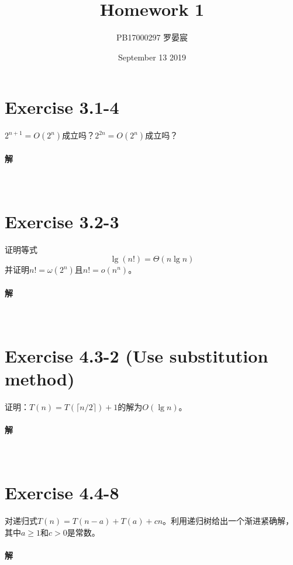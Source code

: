 \documentclass{article}
\title{Homework 1}
\author{PB17000297 罗晏宸}
\date{September 13 2019}
\begin{document}
\maketitle

\section{Exercise 3.1-4}
$2^{n+1}=O(2^n)$成立吗？$2^{2n}=O(2^n)$成立吗？
\\

\paragraph{解} 
\\

\section{Exercise 3.2-3}
证明等式
\begin{equation}
    \lg{(n!)}=\Theta(n \lg{n}) \tag{3.19}
\end{equation}
并证明$n!=\omega (2^n)$且$n!=o(n^n)$。
\\

\paragraph{解}
\\

\section{Exercise 4.3-2 (Use substitution method) }
证明：$T(n)=T(\lceil n/2 \rceil)+1$的解为$O(\lg{n})$。
\\

\paragraph{解}
\\

\section{Exercise 4.4-8}
对递归式$T(n)=T(n-a)+T(a)+cn$。利用递归树给出一个渐进紧确解，其中$a \geq 1$和$c>0$是常数。
\\

\paragraph{解}
\\
\end{document}
